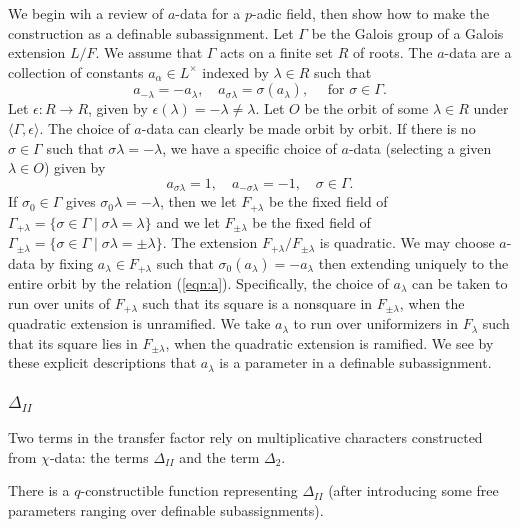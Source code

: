 We begin wih a review of $a$-data for a $p$-adic field, then show how to make the construction as a definable subassignment.
Let $\Gamma$ be the Galois group of a Galois extension $L/F$.  We assume that $\Gamma$ acts on a finite set $R$ of roots.
The $a$-data are a collection of constants $a_\alpha\in L^\times$ indexed by $\lambda\in R$ such that
\begin{equation}\label{eqn:a}
a_{-\lambda} = -a_\lambda,\quad a_{\sigma\lambda} = \sigma(a_\lambda),\quad \text{ for } \sigma\in \Gamma.
\end{equation}
Let $\epsilon:R\to R$, given by $\epsilon(\lambda)=-\lambda\ne\lambda$.  Let $O$ be the orbit of some $\lambda\in R$ under $\langle\Gamma,\epsilon\rangle$.
The choice of $a$-data can clearly be made orbit by orbit.
If there is no $\sigma\in \Gamma$ such that $\sigma\lambda=-\lambda$, we have a specific choice of $a$-data (selecting a given $\lambda\in O$) given by
\[
a_{\sigma\lambda}=1,\quad a_{-\sigma\lambda}=-1,\quad \sigma\in\Gamma.
\]
If $\sigma_0\in\Gamma$ gives $\sigma_0\lambda=-\lambda$,  then we let $F_{+\lambda}$ be the fixed field of $\Gamma_{+\lambda} = \{\sigma\in\Gamma\mid \sigma\lambda=\lambda\}$
and we let
$F_{\pm\lambda}$ be the fixed field of $\Gamma_{\pm\lambda} = \{\sigma\in\Gamma\mid \sigma\lambda=\pm\lambda\}$.
The extension $F_{+\lambda}/F_{\pm\lambda}$ is quadratic.
We may choose $a$-data by fixing $a_\lambda\in F_{+\lambda}$ such that $\sigma_0(a_\lambda) = -a_\lambda$ then extending uniquely to the entire orbit  by the relation (\ref{eqn:a}).
Specifically, the choice of $a_\lambda$ can be taken to run over units of $F_{+\lambda}$ such that its square is a nonsquare in $F_{\pm\lambda}$, when the quadratic extension is unramified.
We take $a_\lambda$ to run over uniformizers in $F_{\lambda}$ such that its square lies in $F_{\pm\lambda}$, when the quadratic extension is ramified.
We see by these explicit descriptions that $a_\lambda$ is a parameter in a definable subassignment.



\subsubsection{$\Delta_{II}$}
Two terms in the transfer factor rely on multiplicative characters constructed from $\chi$-data: the terms $\Delta_{II}$ and the term $\Delta_2$.

\begin{lemma}  There is a $q$-constructible function representing $\Delta_{II}$ (after introducing some free parameters ranging over definable subassignments).
\end{lemma}

